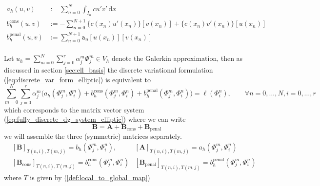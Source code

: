 \begin{align*}
    a_h(u,v) & := \sum_{n=0}^N \int_{I_n} cu'v'\, \text{d}x \\
    b_h^{\text{cons}}(u,v) & := -\sum_{n=0}^{N+1} \{c(x_n)u'(x_n)\}[v(x_n)] + \{c(x_n)v'(x_n)\}[u(x_n)] \\
    b_h^{\text{penal}}(u,v) &:= \sum_{n=0}^{N+1} \texttt{a}_n[u(x_n)][v(x_n)] \\
\end{align*}

Let $\displaystyle u_h = \sum_{m=0}^{N} \sum_{j=0}^{r} \alpha_j^m \Phi_j^m \in V_h$ denote
the Galerkin approximation, then as discussed in section \ref{sec:ell_basis} the discrete variational formulation (\ref{eq:discrete_var_form_elliptic}) is equivalent 
to 
\begin{equation}
    \sum_{m=0}^{N} \sum_{j=0}^{r} \alpha_j^m \Big(
    a_h(\Phi_j^m,\Phi_i^n) + b_h^{\text{cons}}(\Phi_j^m,\Phi_i^n) + b_h^{\text{penal}}(\Phi_j^m,\Phi_i^n)
    \Big)
    = \ell(\Phi_i^n), \qquad \forall n=0,\ldots,N, i=0,\ldots,r
\end{equation}
which corresponds to the matrix vector system (\ref{eq:fully_discrete_dg_system_elliptic}) 
where we can write 
\begin{equation*}
    \textbf{B} = \textbf{A} + \textbf{B}_{\text{cons}} + \textbf{B}_{\text{penal}} 
\end{equation*}
we will assemble the three (symmetric) matrices separately. 
\begin{align*}
    &[\textbf{B}]_{T(n,i),T(m,j)} = b_h(\Phi_j^m, \Phi_i^n),
    &[\textbf{A}]_{T(n,i),T(m,j)} = a_h(\Phi_j^m, \Phi_i^n) \\
    &[\textbf{B}_{\text{cons}}]_{T(n,i),T(m,j)} = b_h^{\text{cons}} (\Phi_j^m, \Phi_i^n)
    &[\textbf{B}_{\text{penal}}]_{T(n,i),T(m,j)} = b_h^{\text{penal}} (\Phi_j^m, \Phi_i^n)
\end{align*}
where $T$ is given by (\ref{def:local_to_global_map})

